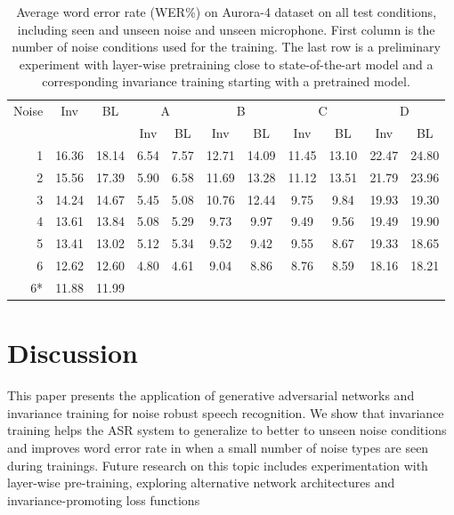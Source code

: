 \documentclass{article}
\begin{document}
\begin{table}
    \centering
    \caption{Average word error rate (WER\%) on Aurora-4 dataset on all test conditions,
        including seen and unseen noise and unseen microphone. First column
        is the number of noise conditions used for the training. The last row is a 
        preliminary experiment with layer-wise pretraining close to state-of-the-art
        model and a corresponding invariance training starting with a pretrained model.}
    \label{tab:results}
    \begin{tabular}{r|cc||cc|cc|cc|cc}
        Noise       &Inv&BL&  \multicolumn{2}{c|}{A} & \multicolumn{2}{c|}{B} & \multicolumn{2}{c|}{C} & \multicolumn{2}{c}{D}\\
               & & &  Inv & BL & Inv & BL & Inv & BL & Inv & BL\\
    \hline
    1           &16.36        &18.14 &6.54&7.57    &12.71& 14.09   & 11.45&   13.10    & 22.47 &   24.80    \\
    2           &15.56        &17.39 &5.90&  6.58 &   11.69   &13.28   &11.12   &13.51   &21.79   &23.96 \\
    3           &14.24        &14.67 &5.45 & 5.08&    10.76&   12.44&   9.75&    9.84 &   19.93&   19.30\\
    4           &13.61        &13.84 & 5.08 &5.29    &9.73    &9.97    &9.49    &9.56    &19.49   &19.90\\         
    5           &13.41        &13.02 & 5.12 &5.34    &9.52    &9.42    &9.55    &8.67    &19.33   &18.65\\         
    6           &12.62        &12.60 & 4.80 &4.61    &9.04    &8.86    &8.76    &8.59    &18.16   &18.21\\
    \hline\hline
    6* &11.88        &11.99
    \end{tabular}
\end{table}

\section{Discussion}
    This paper presents the application of generative adversarial networks and invariance training for noise robust speech recognition. We show that invariance training helps the ASR system to generalize to better to unseen noise
    conditions and improves word error rate in when a small number of noise types are seen during trainings. Future
    research on this topic includes experimentation with layer-wise pre-training,
    exploring alternative network architectures and invariance-promoting loss functions
        
\end{document}
